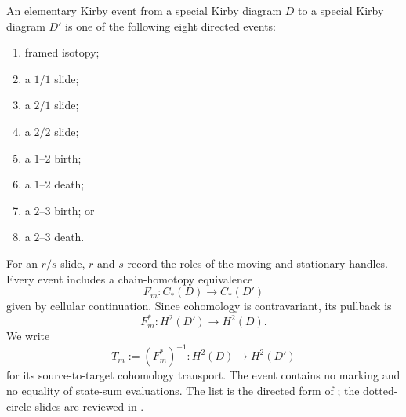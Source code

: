 \begin{definition}
\label{def:kirby-event}
An elementary Kirby event from a special Kirby diagram $D$ to a special
Kirby diagram $D'$ is one of the following eight directed events:
\begin{enumerate}[label=(\roman*),ref=\roman*]
  \item\label{move:framed-isotopy} framed isotopy;
  \item\label{move:one-over-one} a $1/1$ slide;
  \item\label{move:two-over-one} a $2/1$ slide;
  \item\label{move:two-over-two} a $2/2$ slide;
  \item\label{move:one-two-birth} a $1$--$2$ birth;
  \item\label{move:one-two-death} a $1$--$2$ death;
  \item\label{move:two-three-birth} a $2$--$3$ birth; or
  \item\label{move:two-three-death} a $2$--$3$ death.
\end{enumerate}
For an $r/s$ slide, $r$ and $s$ record the roles of the moving and stationary
handles.  Every event includes a chain-homotopy equivalence
\[
  F_m\colon C_*(D)\longrightarrow C_*(D')
\]
given by cellular continuation.  Since cohomology is contravariant, its
pullback is
\[
  F_m^*\colon H^2(D')\longrightarrow H^2(D).
\]
We write
\[
  T_m:=(F_m^*)^{-1}\colon H^2(D)\longrightarrow H^2(D')
\]
for its source-to-target cohomology transport.  The event contains no
marking and no equality of state-sum evaluations.  The list is the directed
form of
\cite[Table~2]{BarenzBarrett2018}; the dotted-circle slides are reviewed in
\cite[Section~5.4]{GompfStipsicz1999}.
\end{definition}

